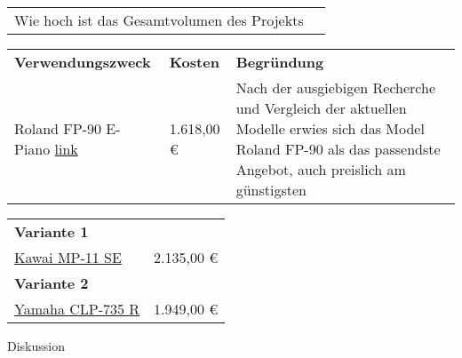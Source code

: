{\begin{tabular}{p{11cm} p{4cm}}
        Wie hoch ist das Gesamtvolumen des Projekts                             &  \\
    \end{tabular}
    \newline
    \vspace*{2em}
    \newline
    \begin{tabular}{p{4cm} p{2cm} p{9cm}}
        \textbf{Verwendungszweck} & \textbf{Kosten} & \textbf{Begründung} \\
        Roland FP-90 E-Piano \newline \href{https://www.session.de/produkt/roland-fp-90-bk/}{link} & 1.618,00 € & Nach der ausgiebigen Recherche und Vergleich der aktuellen Modelle erwies sich das Model Roland FP-90 als das passendste Angebot, auch preislich am günstigsten\\
    \end{tabular}
    \newline
    \vspace*{2em}
    \newline
    \begin{tabular}{p{13cm} p{2cm}}
        \textbf{Variante 1} &\\
        \href{https://www.thomann.de/de/kawai_mp_11_se.htm?glp=1\&gclid=EAIaIQobChMIpPH3_pCb7QIVjtd3Ch0AQQZWEAYYBSABEgKhsfD_BwE}{Kawai MP-11 SE} & 2.135,00 €\\
        \textbf{Variante 2} &\\
        \href{https://www.thomann.de/de/yamaha_clp_735_r.htm}{Yamaha CLP-735 R} & 1.949,00 €\\
    \end{tabular}
    \newline
}{
    Diskussion
}
